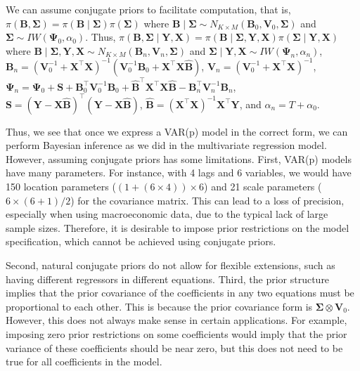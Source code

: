We can assume conjugate priors to facilitate computation, that is, $\pi({\bm{B}},{\bm{\Sigma}})=\pi({\bm{B}}\mid {\bm{\Sigma}})\pi({\bm{\Sigma}})$ where ${\bm{B}}\mid {\bm \Sigma}\sim N_{K\times M}({\bm{B}}_{0},{\bm{V}}_{0},{\bm{\Sigma}})$ and ${\bm{\Sigma}}\sim IW({\bm{\Psi}}_{0},\alpha_{0})$. Thus, $\pi({\bm{B}},{\bm \Sigma}\mid  {\bm{Y}}, {\bm{X}})=\pi ({\bm{B}}\mid  {\bm \Sigma},{\bm{Y}},{\bm{X}})\pi({\bm \Sigma}\mid  {\bm{Y}},{\bm{X}})$ where ${\bm{B}}\mid  {\bm \Sigma},{\bm{Y}}, {\bm{X}} \sim N_{K\times M}({\bm{B}}_n,{\bm{V}}_n,{\bm \Sigma})$ and ${\bm \Sigma}\mid  {\bm{Y}},{\bm{X}} \sim IW({\bm{\Psi}}_n,{\alpha}_n)$, ${\bm{B}}_n = ({\bm{V}}_{0}^{-1}+{\bm{X}}^{\top}{\bm{X}})^{-1}({\bm{V}}_{0}^{-1}{\bm{B}}_{0}+{\bm{X}}^{\top}{\bm{X}}\widehat{\bm{B}})$, ${\bm{V}}_n = ({\bm{V}}_{0}^{-1}+{\bm{X}}^{\top}{\bm{X}})^{-1}$, ${\bm{\Psi}}_n={\bm{\Psi}}_{0}+{\bm{S}}+{\bm{B}}_{0}^{\top}{\bm{V}}_{0}^{-1}{\bm{B}}_{0}+\widehat{\bm{B}}^{\top}{\bm{X}}^{\top}{\bm{X}}\widehat{\bm{B}}-{\bm{B}}_n^{\top}{\bm{V}}_n^{-1}{\bm{B}}_n$, ${\bm{S}}= ({\bm{Y}}-{\bm{X}}\widehat{\bm{B}})^{\top}({\bm{Y}}-{\bm{X}}\widehat{\bm{B}})$, $\widehat{\bm{B}}= ({\bm{X}}^{\top}{\bm{X}})^{-1}{\bm{X}}^{\top}{\bm{Y}}$, and  $\alpha_n= T+\alpha_{0}$. 

Thus, we see that once we express a VAR(p) model in the correct form, we can perform Bayesian inference as we did in the multivariate regression model. However, assuming conjugate priors has some limitations. First, VAR(p) models have many parameters. For instance, with 4 lags and 6 variables, we would have 150 location parameters ($(1 + (6 \times 4)) \times 6$) and 21 scale parameters ($6 \times (6 + 1)/2$) for the covariance matrix. This can lead to a loss of precision, especially when using macroeconomic data, due to the typical lack of large sample sizes. Therefore, it is desirable to impose prior restrictions on the model specification, which cannot be achieved using conjugate priors. 

Second, natural conjugate priors do not allow for flexible extensions, such as having different regressors in different equations. Third, the prior structure implies that the prior covariance of the coefficients in any two equations must be proportional to each other. This is because the prior covariance form is $\bm{\Sigma} \otimes \bm{V}_0$. However, this does not always make sense in certain applications. For example, imposing zero prior restrictions on some coefficients would imply that the prior variance of these coefficients should be near zero, but this does not need to be true for all coefficients in the model.

